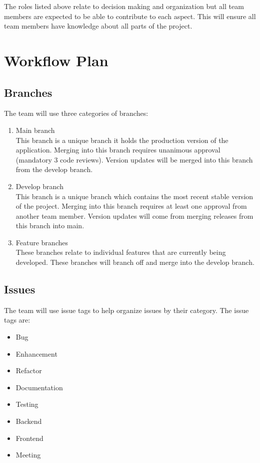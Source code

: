 \documentclass{article}
\begin{document}
\noindent The roles listed above relate to decision making and organization but all team members are expected to be able to contribute to each aspect. 
This will ensure all team members have knowledge about all parts of the project. 


\section{Workflow Plan}

\subsection{Branches}
The team will use three categories of branches: 

\begin{enumerate}
  \item Main branch
  \\
  This branch is a unique branch it holds the production version of the application.
  Merging into this branch requires unanimous approval (mandatory 3 code reviews).
  Version updates will be merged into this branch from the develop branch. 
  \item Develop branch
  \\ This branch is a unique branch which contains the most recent stable version of the project. 
  Merging into this branch requires at least one approval from another team member. 
  Version updates will come from merging releases from this branch into main.  
  \item Feature branches
  \\
  These branches relate to individual features that are currently being developed. These branches will branch off and merge into the develop branch. 
\end{enumerate}

\subsection{Issues}
The team will use issue tags to help organize issues by their category. The issue tags are:
\begin{itemize}
  \item Bug
  \item Enhancement
  \item Refactor
  \item Documentation
  \item Testing
  \item Backend
  \item Frontend
  \item Meeting
\end{itemize}
\end{document}
